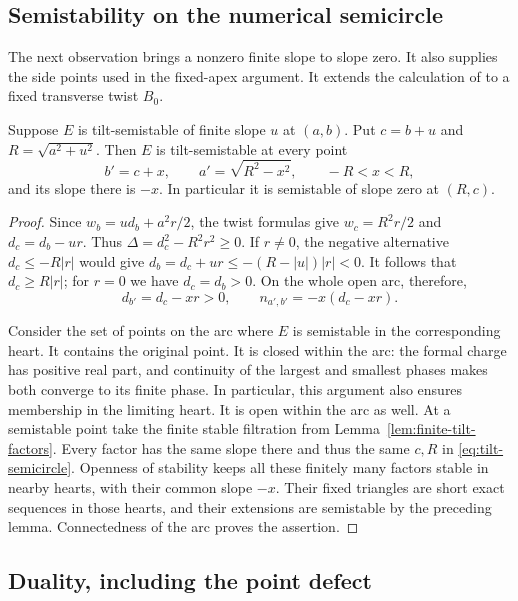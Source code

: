 \subsection{Semistability on the numerical semicircle}

The next observation brings a nonzero finite slope to slope zero.
It also supplies the side points used in the fixed-apex argument.
It extends the calculation of \cite[Lemma~4.3]{BMS2016} to a fixed
transverse twist $B_0$.

\begin{lemma}\label{lem:tilt-semicircle}
Suppose $E$ is tilt-semistable of finite slope $u$ at $(a,b)$.
Put $c=b+u$ and $R=\sqrt{a^2+u^2}$.  Then $E$ is
tilt-semistable at every point
\begin{equation}\label{eq:tilt-semicircle}
 b'=c+x,\qquad a'=\sqrt{R^2-x^2},\qquad -R<x<R,
\end{equation}
and its slope there is $-x$.  In particular it is semistable of
slope zero at $(R,c)$.
\end{lemma}

\begin{proof}
Since $w_b=ud_b+a^2r/2$, the twist formulas give
$w_c=R^2r/2$ and $d_c=d_b-ur$.  Thus
$\Delta=d_c^2-R^2r^2\ge0$.  If $r\ne0$, the negative alternative
$d_c\le-R|r|$ would give
$d_b=d_c+ur\le-(R-|u|)|r|<0$.  It follows that
$d_c\ge R|r|$; for $r=0$ we have $d_c=d_b>0$.
On the whole open arc, therefore,
\[
 d_{b'}=d_c-xr>0,\qquad
 n_{a',b'}=-x(d_c-xr).
\]

Consider the set of points on the arc where $E$ is semistable in
the corresponding heart.  It contains the original point.  It is
closed within the arc: the formal charge has positive real part,
and continuity of the largest and smallest phases makes both
converge to its finite phase.  In particular, this argument also
ensures membership in the limiting heart.
It is open within the arc as well.  At a semistable point take the
finite stable filtration from Lemma~\ref{lem:finite-tilt-factors}.
Every factor has the same slope there and thus the same $c,R$ in
\eqref{eq:tilt-semicircle}.  Openness of stability keeps all these
finitely many factors stable in nearby hearts, with their common
slope $-x$.  Their fixed triangles are short exact sequences in
those hearts, and their extensions are semistable by the preceding
lemma.  Connectedness of the arc proves the assertion.
\end{proof}

\subsection{Duality, including the point defect}

